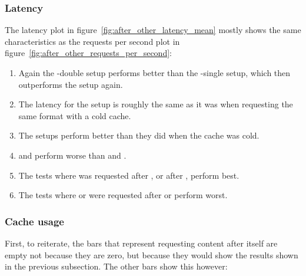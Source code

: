 \documentclass[twoside,openright]{uva-bachelor-thesis}
\begin{document}
\subsubsection{Latency}
The latency plot in figure~\ref{fig:after_other_latency_mean} mostly shows the
same characteristics as the requests per second plot in
figure~\ref{fig:after_other_requests_per_second}:
\begin{enumerate}
    \item
        Again the \lt-double setup performs better than the \lt-single setup,
        which then outperforms the \cdn setup again.

    \item
        The latency for the \cdn setup is roughly the same as it was when
        requesting the same format with a cold cache.

    \item
        The \lt setups perform better than they did when the cache was cold.

    \item
        \hds and \hls perform worse than \iss and \dash.

    \item
        The tests where \dash was requested after \iss, or \iss after \dash,
        perform best.

    \item
        The tests where \hls or \hds were requested after \dash or \iss perform worst.

\end{enumerate}


\FloatBarrier



\subsubsection{Cache usage}
First, to reiterate, the bars that represent requesting content after itself
are empty not because they are zero, but because they would show the results
shown in the previous subsection. The other bars show this however:
\end{document}
